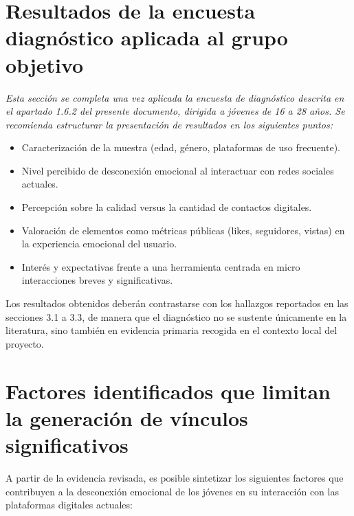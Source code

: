 \section{Resultados de la encuesta diagnóstico aplicada al grupo objetivo}
\textit{Esta sección se completa una vez aplicada la encuesta de diagnóstico descrita en el apartado 1.6.2 del presente documento, dirigida a jóvenes de 16 a 28 años. Se recomienda estructurar la presentación de resultados en los siguientes puntos:}

\begin{itemize}
    \item Caracterización de la muestra (edad, género, plataformas de uso frecuente).
    \item Nivel percibido de desconexión emocional al interactuar con redes sociales actuales.
    \item Percepción sobre la calidad versus la cantidad de contactos digitales.
    \item Valoración de elementos como métricas públicas (likes, seguidores, vistas) en la experiencia emocional del usuario.
    \item Interés y expectativas frente a una herramienta centrada en micro interacciones breves y significativas.
\end{itemize}

Los resultados obtenidos deberán contrastarse con los hallazgos reportados en las secciones 3.1 a 3.3, de manera que el diagnóstico no se sustente únicamente en la literatura, sino también en evidencia primaria recogida en el contexto local del proyecto.

\section{Factores identificados que limitan la generación de vínculos significativos}
A partir de la evidencia revisada, es posible sintetizar los siguientes factores que contribuyen a la desconexión emocional de los jóvenes en su interacción con las plataformas digitales actuales:


